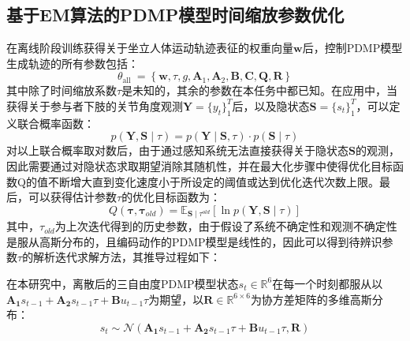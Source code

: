\subsection{基于EM算法的PDMP模型时间缩放参数优化}
在离线阶段训练获得关于坐立人体运动轨迹表征的权重向量$\mathbf{w}$后，控制PDMP模型生成轨迹的所有参数包括：
\begin{equation}
    \theta_{\text {all }}=\left\{\mathbf{w}, \tau, g, \mathbf{A}_1, \mathbf{A}_2, \mathbf{B}, \mathbf{C}, \mathbf{Q}, \mathbf{R}\right\}
    \label{eq:4-16}
\end{equation}
其中除了时间缩放系数$\tau$是未知的，其余的参数在本任务中都已知。在应用中，当获得关于参与者下肢的关节角度观测$\mathbf{Y}=\{ y_t\}_1^T$后，以及隐状态$\mathbf{S}=\{s_t\}_1^T$，可以定义联合概率函数：
\begin{equation}
    p(\mathbf{Y}, \mathbf{S} \mid \tau) = 
    p(\mathbf{Y} \mid  \mathbf{S}, \tau) \cdot p(\mathbf{S} \mid  \tau)
    \label{eq:4-17}
\end{equation}
对以上联合概率取对数后，由于通过感知系统无法直接获得关于隐状态$\mathbf{S}$的观测，因此需要通过对隐状态求取期望消除其随机性，并在最大化步骤中使得优化目标函数Q的值不断增大直到变化速度小于所设定的阈值或达到优化迭代次数上限。最后，可以获得估计参数$\tau$的优化目标函数为：
\begin{equation}
    Q\left(\boldsymbol{\tau}, \boldsymbol{\tau}_{old}\right)=\mathbb{E}_{\mathbf{S} \mid \tau^{old}}[\ln p(\mathbf{Y}, \mathbf{S} \mid \tau)]
    \label{eq:4-18}
\end{equation}
其中，$\tau_{old}$为上次迭代得到的历史参数，由于假设了系统不确定性和观测不确定性是服从高斯分布的，且编码动作的PDMP模型是线性的，因此可以得到待辨识参数$\tau$的解析迭代求解方法，其推导过程如下：

在本研究中，离散后的三自由度PDMP模型状态$s_t\in \mathbb{R}^{6}$在每一个时刻都服从以$\mathbf{A_1}s_{t-1}+\mathbf{A_2}s_{t-1}\tau+\mathbf{B}u_{t-1}\tau$为期望，以$\mathbf{R} \in \mathbb{R}^{6\times 6}$为协方差矩阵的多维高斯分布：
\begin{equation}
  s_t \sim \mathcal N(\mathbf{A_1}s_{t-1}+\mathbf{A_2}s_{t-1}\tau+\mathbf{B}u_{t-1}\tau,\mathbf{R})
  \label{eq:4-19}
\end{equation}

